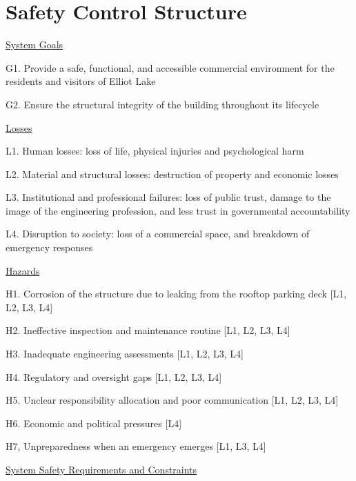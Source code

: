 \documentclass[12pt]{article}
\begin{document}
\section{Safety Control Structure}



\underline{System Goals}

G1. Provide a safe, functional, and accessible commercial environment for the residents and visitors of Elliot Lake

G2. Ensure the structural integrity of the building throughout its lifecycle

\underline{Losses}

L1. Human losses: loss of life, physical injuries and psychological harm

L2. Material and structural losses: destruction of property and economic losses

L3. Institutional and professional failures: loss of public trust, damage to the image of the engineering profession, and less trust in governmental accountability

L4. Disruption to society: loss of a commercial space, and breakdown of emergency responses

\underline{Hazards}

H1. Corrosion of the structure due to leaking from the rooftop parking deck [L1, L2, L3, L4]

H2. Ineffective inspection and maintenance routine [L1, L2, L3, L4]

H3. Inadequate engineering assessments [L1, L2, L3, L4]

H4. Regulatory and oversight gaps [L1, L2, L3, L4]

H5. Unclear responsibility allocation and poor communication [L1, L2, L3, L4]

H6. Economic and political pressures [L4]

H7, Unpreparedness when an emergency emerges [L1, L3, L4]

\underline{System Safety Requirements and Constraints}
\end{document}
